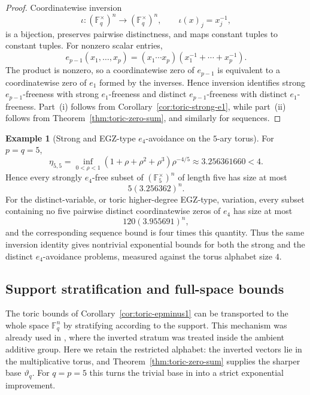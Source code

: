 \documentclass[10pt,a4paper]{amsart}
\theoremstyle{definition}
\newtheorem{example}[theorem]{Example}
\newcommand{\F}{\mathbb F}
\newcommand{\1}{\mathbf 1}
\begin{document}
\begin{proof}
Coordinatewise inversion
\[
 \iota:(\F_q^\times)^n\longrightarrow(\F_q^\times)^n,
 \qquad
 \iota(x)_j=x_j^{-1},
\]
is a bijection, preserves pairwise distinctness, and maps constant tuples to constant tuples.  For nonzero scalar entries,
\[
 e_{p-1}(x_1,\ldots,x_p)
 =(x_1\cdots x_p)\left(x_1^{-1}+\cdots+x_p^{-1}\right).
\]
The product is nonzero, so a coordinatewise zero of $e_{p-1}$ is equivalent to a coordinatewise zero of $e_1$ formed by the inverses.  Hence inversion identifies strong $e_{p-1}$-freeness with strong $e_1$-freeness and distinct $e_{p-1}$-freeness with distinct $e_1$-freeness.  Part~\textup{(i)} follows from Corollary~\ref{cor:toric-strong-e1}, while part~\textup{(ii)} follows from Theorem~\ref{thm:toric-zero-sum}, and similarly for sequences.
\end{proof}


\begin{example}[Strong and EGZ-type $e_4$-avoidance on the $5$-ary torus]\label{ex:toric-e4-five}
For $p=q=5$,
\[
 \eta_{5,5}
 =\inf_{0<\rho<1}(1+\rho+\rho^2+\rho^3)\rho^{-4/5}
 \approx3.256361660<4.
\]
Hence every strongly $e_4$-free subset of $(\F_5^\times)^n$ of length five has size at most
\[
 5(3.256362)^n.
\]
For the distinct-variable, or toric higher-degree EGZ-type, variation, every subset containing no five pairwise distinct coordinatewise zeros of $e_4$ has size at most
\[
 120(3.955691)^n,
\]
and the corresponding sequence bound is four times this quantity.  Thus the same inversion identity gives nontrivial exponential bounds for both the strong and the distinct $e_4$-avoidance problems, measured against the torus alphabet size $4$.
\end{example}


\subsection{Support stratification and full-space bounds}
The toric bounds of Corollary~\ref{cor:toric-epminus1} can be transported to the whole space $\F_q^n$ by stratifying according to the support.  This mechanism was already used in \cite[Theorem~4.3]{CostaDellaFiore}, where the inverted stratum was treated inside the ambient additive group.  Here we retain the restricted alphabet: the inverted vectors lie in the multiplicative torus, and Theorem~\ref{thm:toric-zero-sum} supplies the sharper base $\vartheta_q$.  For $q=p=5$ this turns the trivial base in \cite[Theorem~4.3]{CostaDellaFiore} into a strict exponential improvement.
\end{document}
